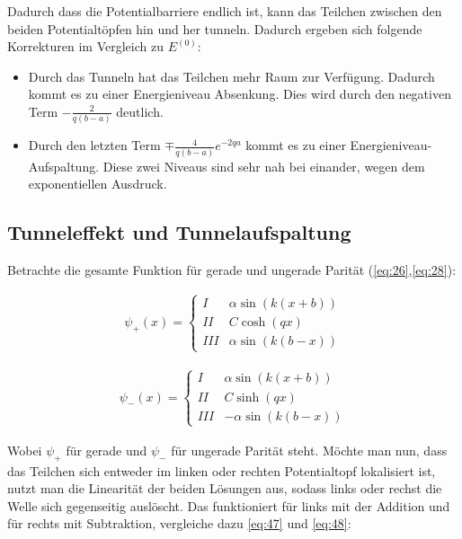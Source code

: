 Dadurch dass die Potentialbarriere endlich ist, kann das Teilchen zwischen den beiden Potentialtöpfen hin und her tunneln. Dadurch ergeben sich folgende Korrekturen im Vergleich zu \(E^{(0)}\):

\begin{itemize}
\item Durch das Tunneln hat das Teilchen mehr Raum zur Verfügung. Dadurch kommt es zu einer Energieniveau Absenkung. Dies wird durch den negativen Term \(-\frac{2}{q(b-a)} \)  deutlich.
\item Durch den letzten Term \(\mp\frac{4}{q(b-a)}e^{-2qa}   \) kommt es zu einer Energieniveau-Aufspaltung. Diese zwei Niveaus sind sehr nah bei einander, wegen dem exponentiellen Ausdruck.
\end{itemize}


\subsection{Tunneleffekt und Tunnelaufspaltung}

Betrachte die gesamte Funktion für gerade und ungerade Parität (\eqref{eq:26},\eqref{eq:28}):

\begin{align}
  \label{eq:47}
\psi_+(x) = \begin{cases}
  I & \alpha \sin(k(x+b)) \\
  II & C\cosh(qx) \qquad  \\
 III & \alpha \sin(k(b-x))
\end{cases}
\end{align}

\begin{align}
  \label{eq:48}
\psi_-(x) = \begin{cases}
  I & \alpha \sin(k(x+b)) \\
  II & C\sinh(qx)  \\
 III & -\alpha \sin(k(b-x))
\end{cases}
\end{align}



Wobei \(\psi_+\) für gerade und \(\psi_-\) für ungerade Parität steht. Möchte man nun, dass das Teilchen sich entweder im linken oder rechten Potentialtopf lokalisiert ist, nutzt man die Linearität der beiden Lösungen aus, sodass links oder rechst die Welle sich gegenseitig auslöscht. Das funktioniert für links mit der Addition und für rechts mit Subtraktion, vergleiche dazu \eqref{eq:47} und \eqref{eq:48}:

